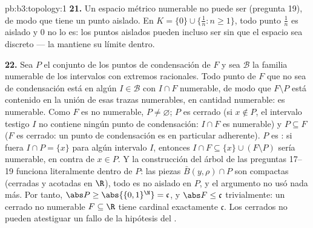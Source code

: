 \begin{solution}{pb:b3:topology:1}
\textbf{21.} Un espacio métrico
 numerable no puede ser
 (pregunta 19), de modo que
tiene un punto aislado. En $K =
\{0\}\cup\{\frac1n : n \geq 1\}$, todo punto $\frac1n$ es aislado y $0$
no lo es: los puntos aislados pueden incluso ser
 sin que el espacio sea
discreto --- la  mantiene su límite dentro.

\textbf{22.} Sea $P$ el conjunto de los puntos de condensación de $F$ y
sea $\mathcal B$ la familia numerable de los intervalos  con
extremos racionales. Todo punto de $F$ que no sea de condensación está
en algún $I \in \mathcal B$ con $I \cap F$ numerable, de modo que $F
\setminus P$ está contenido en la unión de esas trazas numerables, en
cantidad numerable: es numerable. Como $F$ es no numerable,
$P \neq \varnothing$; $P$ es cerrado (si $x \notin P$, el intervalo
testigo $I$ no contiene ningún punto de condensación: $I \cap F$ es
numerable) y $P \subseteq F$ ($F$ es cerrado: un punto de condensación
es en particular adherente). $P$ es
: si fuera $I \cap P = \{x\}$
para algún intervalo $I$, entonces
$I \cap F \subseteq \{x\} \cup (F \setminus P)$ sería numerable, en
contra de $x \in P$. Y la construcción del árbol de las preguntas 17--19
funciona literalmente dentro de $P$: las piezas $\bar B(y, \rho) \cap P$
son compactas (cerradas y acotadas en
$\R$), todo  es no aislado en $P$,
y el argumento no usó nada más. Por tanto, $\abs P \geq
\abs{\{0,1\}^\N} = \mathfrak c$, y $\abs F \leq \mathfrak
c$ trivialmente: un cerrado no numerable $F \subseteq \R$ tiene cardinal
exactamente $\mathfrak c$. Los cerrados no pueden atestiguar un fallo de
la hipótesis del .


\end{solution}
